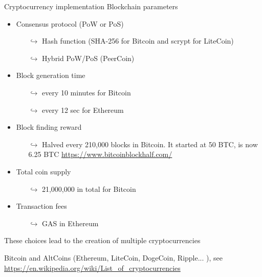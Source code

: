 \documentclass{beamer}
\begin{document}
\begin{frame}{Cryptocurrency implementation}
\scriptsize
Blockchain parameters
\begin{itemize}
  \item Consensus protocol (PoW or PoS) 
  \begin{itemize}
    \item[$\hookrightarrow$] \tiny Hash function (SHA-256 for Bitcoin and scrypt for LiteCoin) 
    \item[$\hookrightarrow$] \tiny Hybrid PoW/PoS (PeerCoin)
  \end{itemize}
  \item Block generation time \scriptsize
    \begin{itemize}
    \item[$\hookrightarrow$] \tiny every 10 minutes for Bitcoin 
    \item[$\hookrightarrow$] \tiny every 12 sec for Ethereum
  \end{itemize}
  \item Block finding reward\scriptsize
  \begin{itemize}
    \item[$\hookrightarrow$] \tiny Halved every 210,000 blocks in Bitcoin. It started at 50 BTC, is now 6.25 BTC \url{https://www.bitcoinblockhalf.com/}
  \end{itemize}
  \item Total coin supply\scriptsize
    \begin{itemize}
    \item[$\hookrightarrow$] \tiny 21,000,000 in total for Bitcoin
  \end{itemize}
  \item Transaction fees\scriptsize
      \begin{itemize}
    \item[$\hookrightarrow$] \tiny GAS in Ethereum
  \end{itemize}
\end{itemize}
These choices lead to the creation of multiple cryptocurrencies 
\begin{tcolorbox}[enhanced,drop shadow, title=Examples]
     Bitcoin and AltCoins (Ethereum, LiteCoin, DogeCoin, Ripple... ), see \url{https://en.wikipedia.org/wiki/List_of_cryptocurrencies}
\end{tcolorbox}

\end{frame}
\end{document}
